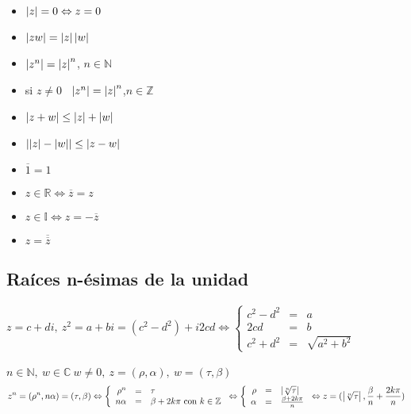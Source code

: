 \documentclass[a4paper,10pt]{article}
\begin{document}
\begin{itemize}
	\item $\left\lvert z\right\rvert = 0 \Leftrightarrow z = 0$
	\item $\left\lvert zw\right\rvert = \left\lvert z\right\rvert \left\lvert w\right\rvert$
	\item $\left\lvert z^{n}\right\rvert=\left\lvert z\right\rvert^{n}$, $n \in \mathbb{N}$
	\item si $z \neq 0$ \ $\left\lvert z^{n}\right\rvert=\left\lvert z\right\rvert^{n}$,$n \in \mathbb{Z}$
	\item $\left\lvert z+w\right\rvert \leq \left\lvert z\right\rvert + \left\lvert w\right\rvert$
	\item $\left\lvert\left\lvert z\right\rvert-\left\lvert w\right\rvert\right\rvert \leq \left\lvert z-w\right\rvert$
	\item $\overline{1} = 1$
	\item $z \in \mathbb{R} \Leftrightarrow \overline{z} = z$
	\item $z \in \mathbb{I} \Leftrightarrow z = -\overline{z}$
	\item $z = \overline{\overline{z}}$
\end{itemize}


\subsection {Raíces n-ésimas de la unidad}


 $z = c+di, \ z^{2} = a+bi = (c^{2}-d^{2})+i2cd \Leftrightarrow 
\left\{
\begin{array}{rcl}
     c^{2} - d^{2} & = & a
  \\ 2cd & = & b
  \\ c^{2} + d^{2} & = & \sqrt {a^{2}+b^{2}}
\end{array}
\right.$ \\ \\

 $n \in \mathbb{N}, \ w \in \mathbb{C} \ w \neq 0, \ z=(\rho,\alpha), \ w = (\tau,\beta)$
$$z^{n}=(\rho^{n},n \alpha) = (\tau,\beta) \Leftrightarrow
\left\{
\begin{array}{rcl}
    \rho^{n} & = & \tau
  \\ n \alpha & = & \beta + 2k\pi \mbox{ con } k \in \mathbb{Z}
\end{array}
\right. \Leftrightarrow
\left\{
\begin{array}{rcl}
    \rho & = & \left\lvert\sqrt[n]{\tau}\right\rvert
  \\ \alpha & = & \frac {\beta + 2k\pi} {n}
\end{array}
\right. \Leftrightarrow z = (\left\lvert\sqrt[n]{\tau}\right\rvert,\frac {\beta} {n} + \frac {2k\pi} {n})
$$ \\ \\
\end{document}
